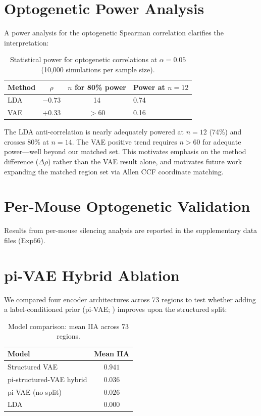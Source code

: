 \documentclass{article}
\begin{document}
\section{Optogenetic Power Analysis}
\label{app:power}

A power analysis for the optogenetic Spearman correlation clarifies the interpretation:

\begin{table}[h]
\centering
\small
\caption{Statistical power for optogenetic correlations at $\alpha = 0.05$ (10,000 simulations per sample size).}
\label{tab:power}
\begin{tabular}{@{}lccl@{}}
\toprule
\textbf{Method} & \textbf{$\rho$} & \textbf{$n$ for 80\% power} & \textbf{Power at $n = 12$} \\
\midrule
LDA & $-0.73$ & 14 & 0.74 \\
VAE & $+0.33$ & $> 60$ & 0.16 \\
\bottomrule
\end{tabular}
\end{table}

The LDA anti-correlation is nearly adequately powered at $n = 12$ (74\%) and crosses 80\% at $n = 14$. The VAE positive trend requires $n > 60$ for adequate power---well beyond our matched set. This motivates emphasis on the method difference ($\Delta\rho$) rather than the VAE result alone, and motivates future work expanding the matched region set via Allen CCF coordinate matching.

\section{Per-Mouse Optogenetic Validation}
\label{app:per_mouse}

Results from per-mouse silencing analysis are reported in the supplementary data files (Exp66).

\section{pi-VAE Hybrid Ablation}
\label{app:pivae}

We compared four encoder architectures across 73 regions to test whether adding a label-conditioned prior (pi-VAE; \citealp{zhou2020pivae}) improves upon the structured split:

\begin{table}[h]
\centering
\small
\caption{Model comparison: mean IIA across 73 regions.}
\label{tab:pivae}
\begin{tabular}{@{}lc@{}}
\toprule
\textbf{Model} & \textbf{Mean IIA} \\
\midrule
Structured VAE & $\mathbf{0.941}$ \\
pi-structured-VAE hybrid & $0.036$ \\
pi-VAE (no split) & $0.026$ \\
LDA & $0.000$ \\
\bottomrule
\end{tabular}
\end{table}
\end{document}
